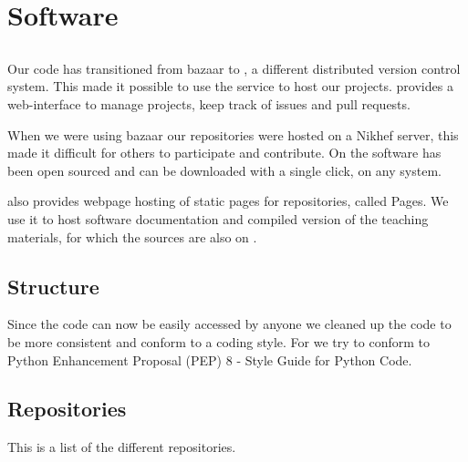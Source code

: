 \chapter{Software}
\label{ch:software}

\section{\github}

Our code has transitioned from bazaar to \git, a different distributed
version control system. This made it possible to use the service \github
to host our projects. \github provides a web-interface to manage
projects, keep track of issues and pull requests.

When we were using bazaar our repositories were hosted on a Nikhef
server, this made it difficult for others to participate and contribute.
On \github the software has been open sourced and can be downloaded with
a single click, on any system.

\github also provides webpage hosting of static pages for repositories,
called \github Pages. We use it to host software documentation and
compiled version of the teaching materials, for which the sources are
also on \github.


\section{Structure}

Since the code can now be easily accessed by anyone we cleaned up the
code to be more consistent and conform to a coding style. For \python we
try to conform to Python Enhancement Proposal (PEP) 8 - Style Guide for
Python Code.


\section{Repositories}

This is a list of the different repositories.

